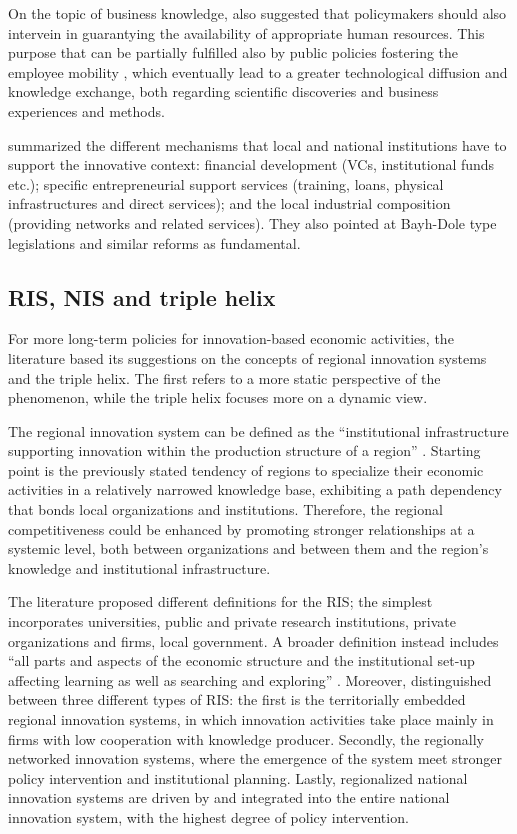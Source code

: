 On the topic of business knowledge, \citet{Chapple2005} also suggested that policymakers should also intervein in guarantying the availability of appropriate human resources. This purpose that can be partially fulfilled also by public policies fostering the employee mobility \citep{Franco2000}, which eventually lead to a greater technological diffusion and knowledge exchange, both regarding scientific discoveries and business experiences and methods. 

\citet{Fini2009} summarized the different mechanisms that local and national institutions have to support the innovative context: financial development (VCs, institutional funds etc.); specific entrepreneurial support services (training, loans, physical infrastructures and direct services); and the local industrial composition (providing networks and related services). They also pointed at Bayh-Dole type legislations and similar reforms as fundamental. 

\subsection{RIS, NIS and triple helix}

For more long-term policies for innovation-based economic activities, the literature based its suggestions on the concepts of regional innovation systems and the triple helix. The first refers to a more static perspective of the phenomenon, while the triple helix focuses more on a dynamic view.

The regional innovation system can be defined as the \enquote{institutional infrastructure supporting innovation within the production structure of a region} \citep{Asheim2009}. Starting point is the previously stated tendency of regions to specialize their economic activities in a relatively narrowed knowledge base, exhibiting a path dependency that bonds local organizations and institutions. Therefore, the regional competitiveness could be enhanced by promoting stronger relationships at a systemic level, both between organizations and between them and the region's knowledge and institutional infrastructure.

The literature proposed different definitions for the RIS; the simplest incorporates universities, public and private research institutions, private organizations and firms, local government. A broader definition instead includes \enquote{all parts and aspects of the economic structure and the institutional set-up affecting learning as well as searching and exploring} \citep{Etzkowitz2000}. Moreover, \citet{Asheim2009} distinguished between three different types of RIS: the first is the territorially embedded regional innovation systems, in which innovation activities take place mainly in firms with low cooperation with knowledge producer. Secondly, the regionally networked innovation systems, where the emergence of the system meet stronger policy intervention and institutional planning. Lastly, regionalized national innovation systems are driven by and integrated into the entire national innovation system, with the highest degree of policy intervention.

